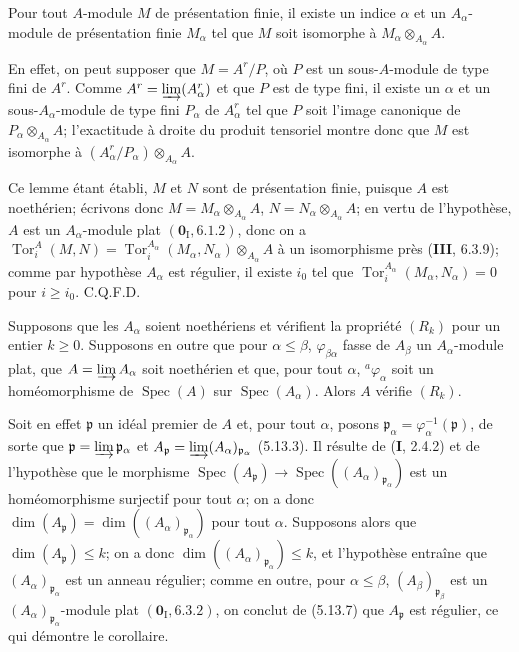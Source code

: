 \begin{lemma}[5.13.7.1]
\label{IV.2.s5.13.7.1-fr}
Pour tout $A$-module $M$ de présentation finie, il existe un indice $\alpha$
et un $A_\alpha$-module de présentation finie $M_\alpha$ tel que $M$ soit
isomorphe à $M_\alpha\otimes_{A_\alpha}A$.
\end{lemma}

En effet, on peut supposer que $M=A^r/P$, où $P$ est un sous-$A$-module de
type fini de $A^r$. Comme $A^r=\varinjlim(A_\alpha^r)$ et que $P$ est de type
fini, il existe un $\alpha$ et un sous-$A_\alpha$-module de type fini
$P_\alpha$ de $A_\alpha^r$ tel que $P$ soit l'image canonique de
$P_\alpha\otimes_{A_\alpha}A$; l'exactitude à droite du produit tensoriel
montre donc que $M$ est isomorphe à
$(A_\alpha^r/P_\alpha)\otimes_{A_\alpha}A$.

Ce lemme étant établi, $M$ et $N$ sont de présentation finie, puisque $A$ est
noethérien; écrivons donc
$M=M_\alpha\otimes_{A_\alpha}A$,
$N=N_\alpha\otimes_{A_\alpha}A$; en vertu de l'hypothèse, $A$ est un
$A_\alpha$-module plat $(\mathbf{0}_{\mathrm I}, 6.1.2)$, donc on a
$\operatorname{Tor}^A_i(M,N)
=\operatorname{Tor}^{A_\alpha}_i(M_\alpha,N_\alpha)
 \otimes_{A_\alpha}A$
à un isomorphisme près (\textbf{III}, 6.3.9); comme par hypothèse $A_\alpha$ est
régulier, il existe $i_0$ tel que
$\operatorname{Tor}^{A_\alpha}_i(M_\alpha,N_\alpha)=0$ pour $i\geq i_0$.
C.Q.F.D.

\begin{corollary}[5.13.8]
\label{IV.2.s5.13.8-fr}
Supposons que les $A_\alpha$ soient noethériens et vérifient la propriété
$(R_k)$ pour un entier $k\geq0$. Supposons en outre que pour
$\alpha\leq\beta$, $\varphi_{\beta\alpha}$ fasse de $A_\beta$ un
$A_\alpha$-module plat, que $A=\varinjlim A_\alpha$ soit noethérien et que,
pour tout $\alpha$, ${}^a\varphi_\alpha$ soit un homéomorphisme de
$\operatorname{Spec}(A)$ sur $\operatorname{Spec}(A_\alpha)$. Alors $A$
vérifie $(R_k)$.
\end{corollary}

Soit en effet $\mathfrak p$ un idéal premier de $A$ et, pour tout $\alpha$,
posons $\mathfrak p_\alpha=\varphi_\alpha^{-1}(\mathfrak p)$, de sorte que
$\mathfrak p=\varinjlim\mathfrak p_\alpha$ et
$A_{\mathfrak p}=\varinjlim(A_\alpha)_{\mathfrak p_\alpha}$ (5.13.3). Il
résulte de (\textbf{I}, 2.4.2) et de l'hypothèse que le morphisme
$\operatorname{Spec}(A_{\mathfrak p})
\longrightarrow\operatorname{Spec}((A_\alpha)_{\mathfrak p_\alpha})$
est un homéomorphisme surjectif pour tout $\alpha$; on a donc
$\dim(A_{\mathfrak p})=\dim((A_\alpha)_{\mathfrak p_\alpha})$ pour tout
$\alpha$. Supposons alors que $\dim(A_{\mathfrak p})\leq k$; on a donc
$\dim((A_\alpha)_{\mathfrak p_\alpha})\leq k$, et l'hypothèse entraîne que
$(A_\alpha)_{\mathfrak p_\alpha}$ est un anneau régulier; comme en outre, pour
$\alpha\leq\beta$, $(A_\beta)_{\mathfrak p_\beta}$ est un
$(A_\alpha)_{\mathfrak p_\alpha}$-module plat $(\mathbf{0}_{\mathrm I}, 6.3.2)$, on
conclut de (5.13.7) que $A_{\mathfrak p}$ est régulier, ce qui démontre le
corollaire.

